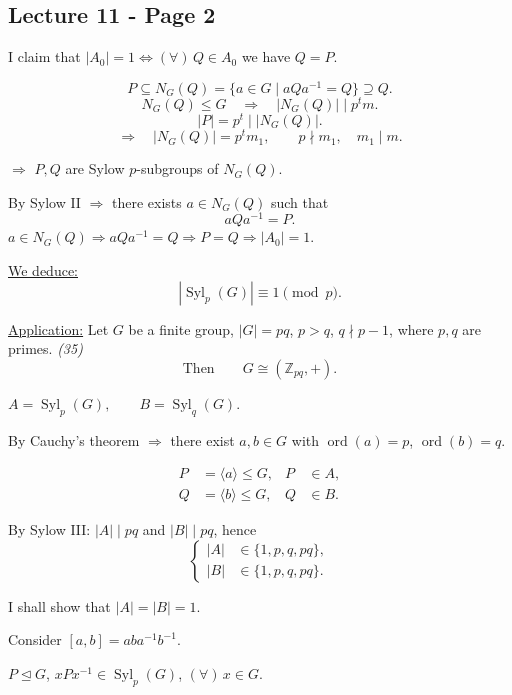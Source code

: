 
\subsection*{Lecture 11 - Page 2}

\noindent I claim that $|A_0|=1 \Longleftrightarrow
(\forall)\,Q\in A_0$ we have $Q=P$.

\medskip
\[
P\subseteq N_G(Q)=\{a\in G\mid aQa^{-1}=Q\}\supseteq Q.
\]
\[
N_G(Q)\leq G \quad\Longrightarrow\quad |N_G(Q)|\mid p^t m.
\]
\[
|P|=p^t\mid |N_G(Q)|.
\]
\[
\Longrightarrow\quad |N_G(Q)|=p^t m_1,
\qquad p\nmid m_1,\quad m_1\mid m.
\]

\noindent $\Longrightarrow$ $P,Q$ are Sylow $p$-subgroups of $N_G(Q)$.

\medskip
\noindent By Sylow II $\Longrightarrow$ there exists $a\in N_G(Q)$ such that
\[
aQa^{-1}=P.
\]
\noindent $a\in N_G(Q) \Longrightarrow aQa^{-1}=Q
\Longrightarrow P=Q \Longrightarrow |A_0|=1$.

\medskip
\noindent\underline{We deduce:}
\[
|\operatorname{Syl}_p(G)|\equiv1\pmod p.
\]

\bigskip
\noindent\underline{Application:}
Let $G$ be a finite group, $|G|=pq$, $p>q$, $q\nmid p-1$,
where $p,q$ are primes. \textit{(35)}
\[
\text{Then}\qquad G\cong (\mathbb{Z}_{pq},+).
\]

\noindent $A=\operatorname{Syl}_p(G),\qquad B=\operatorname{Syl}_q(G)$.

\medskip
\noindent By Cauchy's theorem $\Longrightarrow$ there exist $a,b\in G$
with $\operatorname{ord}(a)=p$, $\operatorname{ord}(b)=q$.

\[
\begin{aligned}
P&=\langle a\rangle\leq G, & P&\in A,\\
Q&=\langle b\rangle\leq G, & Q&\in B.
\end{aligned}
\]

\noindent By Sylow III:
$|A|\mid pq$ and $|B|\mid pq$, hence
\[
\left\{
\begin{aligned}
|A|&\in\{1,p,q,pq\},\\
|B|&\in\{1,p,q,pq\}.
\end{aligned}
\right.
\]

\noindent I shall show that $|A|=|B|=1$.

\medskip
\noindent Consider $[a,b]=aba^{-1}b^{-1}$.

\medskip
\noindent $P\trianglelefteq G$,\quad
$xPx^{-1}\in\operatorname{Syl}_p(G)$, $(\forall)\,x\in G$.
